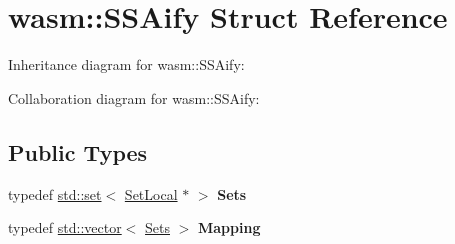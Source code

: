 \hypertarget{structwasm_1_1_s_s_aify}{}\section{wasm\+:\+:S\+S\+Aify Struct Reference}
\label{structwasm_1_1_s_s_aify}


Inheritance diagram for wasm\+:\+:S\+S\+Aify\+:


Collaboration diagram for wasm\+:\+:S\+S\+Aify\+:
\subsection*{Public Types}
\begin{DoxyCompactItemize}
\item 
\mbox{\label{structwasm_1_1_s_s_aify_a5dacadd6423b1c3acc5c5d3a17b6ab1f}} 
typedef \mbox{\hyperlink{classstd_1_1set}{std\+::set}}$<$ \mbox{\hyperlink{classwasm_1_1_set_local}{Set\+Local}} $\ast$ $>$ {\bfseries Sets}
\item 
\mbox{\label{structwasm_1_1_s_s_aify_a52295ebe47ecee438aceae57f6dbb3dd}} 
typedef \mbox{\hyperlink{classstd_1_1vector}{std\+::vector}}$<$ \mbox{\hyperlink{classstd_1_1set}{Sets}} $>$ {\bfseries Mapping}
\end{DoxyCompactItemize}
